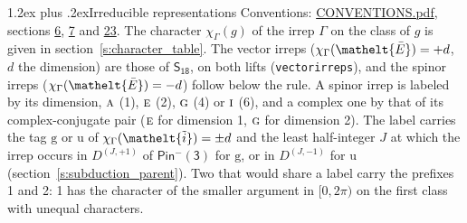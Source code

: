 \documentclass[10pt,a4paper]{article}
\makeatletter
\renewcommand\section{\@startsection{section}{1}{\z@}{-3ex plus -1ex minus -.2ex}%
  {1.2ex plus .2ex}{\normalfont\large\sffamily\bfseries\color{parttitle}}}
\numberwithin{equation}{section}
\newcommand{\eltfont}[1]{{\let\sigma\eltsigma\mathelt{#1}}}
\newcommand{\grp}[1]{\mathsf{#1}}
\newcommand{\irr}[1]{\text{\normalfont\scshape #1}}
\newcommand{\elt}[1]{\eltfont{#1}}
\newcommand{\ptag}[1]{\mathrm{#1}}
\newcommand{\irrJp}[2]{D^{(#1,#2)}}
\newcommand{\irchar}[1]{\chi_{#1}}
\newcommand{\barred}[1]{\bar{#1}}
\newcommand{\lift}[1]{\tilde{#1}}
\makeatother
\begin{document}
\section{Irreducible representations}\label{s:irreps}
Conventions: \href{../../CONVENTIONS.pdf}{CONVENTIONS.pdf}, sections \href{../../../rotation/CONVENTIONS.pdf\#conv.6}{6}, \href{../../../rotation/CONVENTIONS.pdf\#conv.7}{7} and \href{../../CONVENTIONS.pdf\#conv.23}{23}.
\leavevmode\label{n:function.character}\label{n:irrep.Gamma}The character $\irchar{\Gamma}(g)$ of the irrep $\Gamma$ on the class of $g$ is given in section~\ref{s:character_table}. \label{n:index.dimension}The vector irreps ($\irchar{\Gamma}(\elt{\barred{E}}) = +d$, $d$ the dimension) are those of \href{../../../rotation/data/pdf/S18.pdf}{$\grp{S_{18}}$}, on both lifts (\texttt{vectorirreps}), and the spinor irreps ($\irchar{\Gamma}(\elt{\barred{E}}) = -d$) follow below the rule. A spinor irrep is labeled by its dimension, $\irr{a}$ (1), $\irr{e}$ (2), $\irr{g}$ (4) or $\irr{i}$ (6), and a complex one by that of its complex-conjugate pair ($\irr{e}$ for dimension 1, $\irr{g}$ for dimension 2). The label carries the tag $\ptag{g}$ or $\ptag{u}$ of $\irchar{\Gamma}(\elt{\lift{i}}) = \pm d$ and the least half-integer $J$ at which the irrep occurs in $\irrJp{J}{+1}$ of $\grp{Pin^{-}(3)}$ for $\ptag{g}$, or in $\irrJp{J}{-1}$ for $\ptag{u}$ (section~\ref{s:subduction_parent}). Two that would share a label carry the prefixes 1 and 2: 1 has the character of the smaller argument in $[0, 2\pi)$ on the first class with unequal characters.
\end{document}
